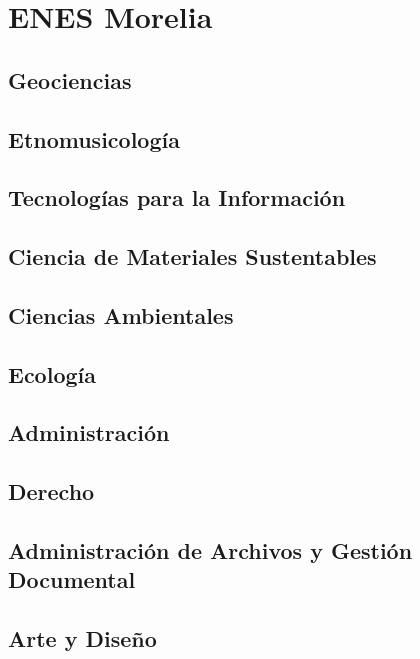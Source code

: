 \section{ENES Morelia}

\subsection{Geociencias}

\subsection{Etnomusicología}

\subsection{Tecnologías para la Información}

\subsection{Ciencia de Materiales Sustentables}

\subsection{Ciencias Ambientales}

\subsection{Ecología}

\subsection{Administración}

\subsection{Derecho}

\subsection{Administración de Archivos y Gestión Documental}

\subsection{Arte y Diseño}

